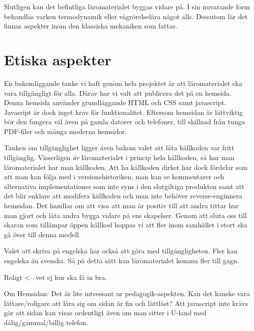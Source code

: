 \begin{binge}
Slutligen kan det befintliga läromaterialet byggas vidare på. I sin nuvarande form behandlas varken termodynamik eller vågrörelselära något alls. Dessutom lär det finnas aspekter inom den klassiska mekaniken som fattas.

\section{Etiska aspekter}

En bakomliggande tanke vi haft genom hela projektet är att läromaterialet ska vara tillgängligt för alla. Därav har vi valt att publicera det på en hemsida. Denna hemsida använder grundläggande HTML och CSS samt javascript. Javasript är dock inget krav för funktionalitet. Eftersom hemsidan är lättviktig bör den fungera väl även på gamla datorer och telefoner, till skillnad från tunga PDF-filer och många moderna hemsidor.

Tanken om tillgänglighet ligger även bakom valet att låta källkoden var fritt tillgänglig. Visserligen \textit{är} läromaterialet i princip hela källkoden, så har man läromaterialet har man källkoden. Att ha källkoden dirket har dock fördelar som att man kan följa med i versionshistoriken, man kan se kommentarer och alternativa implementationer som inte syns i den slutgiltiga produkten samt att det blir enklare att modifera källkoden och man inte behöver reverse-enginnera hemsidan. Det handlar om att visa att man är positiv till att andra tittar hur man gjort och låta andra bygga vidare på ens skapelser. Genom att sluta oss till skaran som tillämpar öppen källkod hoppas vi att fler inom samhället i stort ska gå över till denna modell.

Valet att skriva på engelska har också att göra med tillgängligheten. Fler kan engelska än svenska. Så på detta sätt kan läromaterialet komma fler till gagn.

Roligt <-- vet ej hur ska få in bra.



Om Hemsidan:
  Det är lite intressant ur pedagogik-aspekten. Kan det
  kanske vara lättare/roligare att lära sig om sidan är fin och
  lättläst? Att javascript inte krävs gör att sidan kan visas ordentligt
  även om man sitter i U-land med dålig/gammal/billig telefon.


\end{binge}
